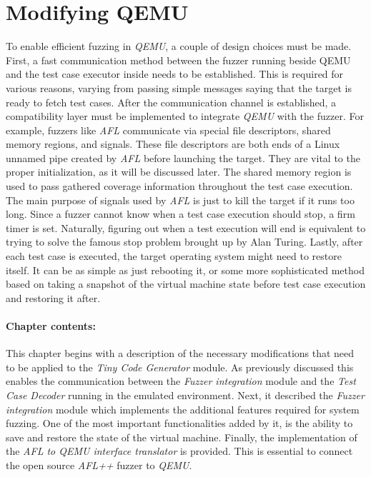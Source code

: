 \cleardoublepage
\section{Modifying QEMU} \label{chap:qemu}

To enable efficient fuzzing in \textit{QEMU}, a couple of design choices must be made. First, a fast communication method between the fuzzer running beside QEMU and the test case executor inside needs to be established. This is required for various reasons, varying from passing simple messages saying that the target is ready to fetch test cases. After the communication channel is established, a compatibility layer must be implemented to integrate \textit{QEMU} with the fuzzer. For example, fuzzers like \textit{AFL} communicate via special file descriptors, shared memory regions, and signals. These file descriptors are both ends of a Linux unnamed pipe created by \textit{AFL} before launching the target. 
They are vital to the proper initialization, as it will be discussed later. The shared memory region is used to pass gathered coverage information throughout the test case execution. The main purpose of signals used by \textit{AFL} is just to kill the target if it runs too long. Since a fuzzer cannot know when a test case execution should stop, a firm timer is set. Naturally, figuring out when a test execution will end is equivalent to trying to solve the famous stop problem brought up by Alan Turing. Lastly, after each test case is executed, the target operating system might need to restore itself. It can be as simple as just rebooting it, or some more sophisticated method based on taking a snapshot of the virtual machine state before test case execution and restoring it after.

\paragraph{Chapter contents:}
This chapter begins with a description of the necessary modifications that need to be applied to the \textit{Tiny Code Generator} module. As previously discussed this enables the communication between the \textit{Fuzzer integration} module and the \textit{Test Case Decoder} running in the emulated environment. Next, it described the \textit{Fuzzer integration} module which implements the additional features required for system fuzzing. One of the most important functionalities added by it, is the ability to save and restore the state of the virtual machine. Finally, the implementation of the \textit{AFL to QEMU interface translator} is provided. This is essential to connect the open source \textit{AFL++} fuzzer to \textit{QEMU}.


